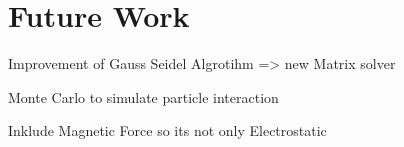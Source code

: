 \chapter{Future Work}

Improvement of Gauss Seidel Algrotihm => new Matrix solver

Monte Carlo to simulate particle interaction

Inklude Magnetic Force so its not only Electrostatic 